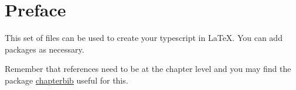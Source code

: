\chapter*{Preface}
\label{Preface}


This set of files can be used to create your typescript in \LaTeX. You can add packages as necessary.

Remember that references need to be at the chapter level and you may find the package \href{http://www.ctan.org/pkg/chapterbib}{chapterbib} useful for this.